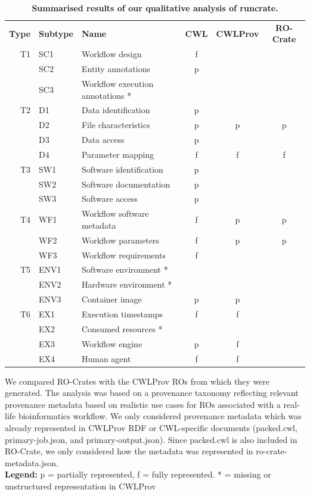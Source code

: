 \documentclass[10pt,letterpaper]{article}
\newlength\savedwidth
\newcommand\thickhline{\noalign{\global\savedwidth\arrayrulewidth\global\arrayrulewidth 2pt}%
\hline
\noalign{\global\arrayrulewidth\savedwidth}}
\begin{document}
\begin{table}[!ht]
\begin{adjustwidth}{-1.4cm}{0in} %
\centering
\caption{
{\bf Summarised results of our qualitative analysis of runcrate.}}
\begin{tabular}{r|l|l|c|c|c}
\hline
{\bf Type} & {\bf Subtype} & {\bf Name} & {\bf CWL} & {\bf CWLProv} & {\bf RO-Crate} \\ \thickhline
T1 & SC1 & Workflow design & f & &\\ 
& SC2 & Entity annotations & p & &\\ 
& SC3 & Workflow execution annotations * & & &\\ \hline
T2 & D1 & Data identification & p & & \\
& D2 & File characteristics & p & p & p \\
& D3 & Data access & p & & \\ 
& D4 & Parameter mapping & f & f & f \\ \hline 
T3 & SW1 & Software identification & p & & \\ 
& SW2 & Software documentation & p & & \\  
& SW3 & Software access & p & & \\ \hline 
T4 & WF1 & Workflow software metadata & f & p & p\\ 
& WF2 & Workflow parameters & f & p & p \\ 
& WF3 & Workflow requirements & f & & \\ \hline 
T5 & ENV1 & Software environment * & & & \\ 
& ENV2 & Hardware environment * & & &\\ 
& ENV3 & Container image & p & p & \\ \hline 
T6 & EX1 & Execution timestamps & f & f &\\ 
& EX2 & Consumed resources * & & & \\ 
& EX3 & Workflow engine & p & f & \\  
& EX4 & Human agent & f & f & \\ \hline
\end{tabular}
\begin{flushleft} We compared RO-Crates with the CWLProv ROs from which they were generated.
The analysis was based on a provenance taxonomy reflecting relevant provenance metadata based on realistic use cases for ROs associated with a real-life bioinformatics workflow.
We only considered provenance metadata which was already represented in CWLProv RDF or CWL-specific documents (packed.cwl, primary-job.json, and primary-output.json).
Since packed.cwl is also included in RO-Crate, we only considered how the metadata was represented in ro-crate-metadata.json.\\
\textbf{Legend:} p = partially represented, f = fully represented. * = missing or unstructured representation in CWLProv
\end{flushleft}
\label{analysis_table}
\end{adjustwidth}
\end{table}
\end{document}
